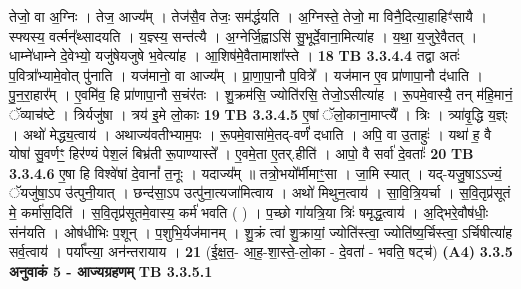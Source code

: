 \documentclass[17pt]{extarticle}
\begin{document}
{{{{{{{{{{{{{{{{{{{                  तेजो॒ वा अ॒ग्निः । तेज॒ आज्य᳚म् । तेज॑सै॒व तेजः॒ सम॑र्द्धयति । अ॒ग्निस्ते॒ तेजो॒ मा विनै॒दित्या॒हाहिꣳ॑सायै । स्फ्यस्य॒ वर्त्मन्᳚थ्सादयति । य॒ज्ञ्स्य॒ सन्त॑त्यै । अ॒ग्नेर्जि॒ह्वाऽसि॑ सु॒भूर्दे॒वाना॒मित्या॑ह । य॒था॒ य॒जुरे॒वैतत् । धाम्ने॑धाम्ने दे॒वेभ्यो॒ यजु॑षेयजुषे भ॒वेत्या॑ह । आ॒शिष॑मे॒वैतामाशा᳚स्ते । \textbf{ 18} \newline
                  \newline
                                \textbf{ TB 3.3.4.4} \newline
                  तद्वा अतः॑ प॒वित्रा᳚भ्यामे॒वोत् पु॑नाति । यज॑मानो॒ वा आज्य᳚म् । प्रा॒णा॒पा॒नौ प॒वित्रे᳚ । यज॑मान ए॒व प्रा॑णापा॒नौ द॑धाति । पु॒न॒रा॒हार᳚म् । ए॒वमि॑व॒ हि प्रा॑णापा॒नौ स॒चंर॑तः । शु॒क्रम॑सि॒ ज्योति॑रसि॒ तेजो॒ऽसीत्या॑ह । रू॒पमे॒वास्यै॒ तन् म॑हि॒मानं॒ ॅव्याच॑ष्टे । त्रिर्यजु॑षा । त्रय॑ इ॒मे लो॒काः \textbf{ 19} \newline
                  \newline
                                \textbf{ TB 3.3.4.5} \newline
                  ए॒षां ॅलो॒काना॒माप्त्यै᳚ । त्रिः । त्र्या॑वृ॒द्धि य॒ज्ञ्ः । अथो॑ मेद्ध्य॒त्वाय॑ । अथाज्य॑वतीभ्याम॒पः । रू॒पमे॒वासा॑मे॒तद्-वर्णं॑ दधाति । अपि॒ वा उ॒ताहुः॑ । यथा॑ ह॒ वै योषा॑ सु॒वर्णꣳ॒॒ हिर॑ण्यं पेश॒लं बिभ्र॑ती रू॒पाण्यास्ते᳚ । ए॒वमे॒ता ए॒तर्.हीति॑ । आपो॒ वै सर्वा॑ दे॒वताः᳚ \textbf{ 20} \newline
                  \newline
                                \textbf{ TB 3.3.4.6} \newline
                  ए॒षा हि विश्वे॑षां दे॒वानां᳚ त॒नूः । यदाज्य᳚म् ॥ तत्रो॒भयो᳚र्मीमाꣳ॒॒सा । जा॒मि स्यात् । यद्-यजु॒षाऽऽज्यं॒ ॅयजु॑षा॒ऽप उ॑त्पुनी॒यात् । छन्द॑सा॒ऽप उत्पु॑ना॒त्यजा॑मित्वाय । अथो॑ मिथुन॒त्वाय॑ । सा॒वि॒त्रि॒यर्चा । स॒वि॒तृप्र॑सूतं मे॒ कर्मा॑स॒दिति॑ । स॒वि॒तृप्र॑सूतमे॒वास्य॒ कर्म॑ भवति ( ) । प॒च्छो गा॑यत्रि॒या त्रिः॑ षमृद्ध॒त्वाय॑ । अ॒द्भिरे॒वौष॑धीः॒ संन॑यति । ओष॑धीभिः प॒शून् । प॒शुभि॒र्यज॑मानम् । शु॒क्रं त्वा॑ शु॒क्रायां॒ ज्योति॑स्त्वा॒ ज्योति॑ष्य॒र्चिस्त्वा॒ ऽर्चिषीत्या॑ह सर्व॒त्वाय॑ । पर्या᳚प्त्या॒ अन॑न्तरायाय । \textbf{ 21} \newline
                  \newline
                                    (ई॒क्ष॒त॒- आ॒ह॒-शा॒स्ते॒-लो॒का - दे॒वता॑ - भवति॒ षट्च॑) \textbf{(A4)} \newline \newline
                \textbf{ 3.3.5     अनुवाकं   5 - आज्यग्रहणम्} \newline
                                \textbf{ TB 3.3.5.1} \newline
}}}}}}}}}}}}}}}}}}}
\end{document}
